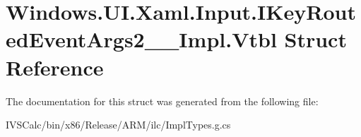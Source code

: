 \hypertarget{struct_windows_1_1_u_i_1_1_xaml_1_1_input_1_1_i_key_routed_event_args2_____impl_1_1_vtbl}{}\section{Windows.\+U\+I.\+Xaml.\+Input.\+I\+Key\+Routed\+Event\+Args2\+\_\+\+\_\+\+Impl.\+Vtbl Struct Reference}
\label{struct_windows_1_1_u_i_1_1_xaml_1_1_input_1_1_i_key_routed_event_args2_____impl_1_1_vtbl}


The documentation for this struct was generated from the following file\+:\begin{DoxyCompactItemize}
\item 
I\+V\+S\+Calc/bin/x86/\+Release/\+A\+R\+M/ilc/Impl\+Types.\+g.\+cs\end{DoxyCompactItemize}
